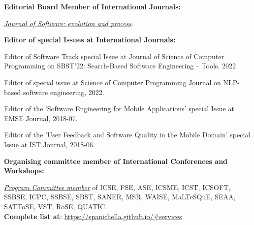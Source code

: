 \documentclass[11pt]{article}
\newcommand\on[1]{\nbc{ON}{#1}{red}} %
\begin{document}
\textbf{Editorial Board Member of International Journals:}
\begin{innerlist}
   \item \emph{
              \href{http://onlinelibrary.wiley.com/journal/10.1002/(ISSN)2047-7481��}
                   {Journal of Software: evolution and process}}.
\end{innerlist}
\medskip 
\textbf{Editor of special Issues at International Journals:}
\begin{innerlist}
\item Editor of Software Track special Issue at Journal of Science of Computer Programming on SBST’22: Search-Based Software Engineering – Tools. 2022
\item Editor of special issue at Science of Computer Programming Journal on NLP-based software engineering, 2022.
\item Editor of the 'Software Engineering for Mobile Applications' special Issue at EMSE Journal, 2018-07.
\item Editor of the 'User Feedback and Software Quality in the Mobile Domain' special Issue at IST Journal,  2018-06.
	
\end{innerlist}
\medskip 
\textbf{Organising committee member of International Conferences and Workshops:}
\begin{innerlist}
 \item \href{https://spanichella.github.io/#services}{\textit{Program Committee member}} of ICSE, FSE, ASE, ICSME, ICST, ICSOFT, SSBSE, ICPC, SSBSE, SBST, SANER, MSR, WAISE, MaLTeSQuE, SEAA, SATToSE, VST, RoSE, QUATIC. \\\textbf{Complete list at}: \href{https://spanichella.github.io/\#services}{https://spanichella.github.io/\#services}
 \end{innerlist}




\end{document}

